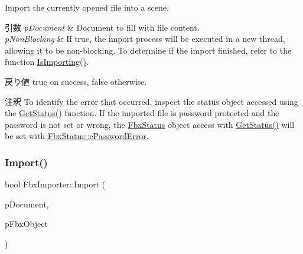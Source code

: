 Import the currently opened file into a scene. 
\begin{DoxyParams}{引数}
{\em p\+Document} & Document to fill with file content. \\
\hline
{\em p\+Non\+Blocking} & If true, the import process will be executed in a new thread, allowing it to be non-\/blocking. To determine if the import finished, refer to the function \hyperlink{class_fbx_importer_a8146a9982be07e4e287eb17b1c291c0b}{Is\+Importing()}. \\
\hline
\end{DoxyParams}
\begin{DoxyReturn}{戻り値}
{\ttfamily true} on success, {\ttfamily false} otherwise. 
\end{DoxyReturn}
\begin{DoxyRemark}{注釈}
To identify the error that occurred, inspect the status object accessed using the \hyperlink{class_fbx_i_o_base_a078e47a99b119278ca3ee639e2da5b6d}{Get\+Status()} function. If the imported file is password protected and the password is not set or wrong, the \hyperlink{class_fbx_status}{Fbx\+Status} object access with \hyperlink{class_fbx_i_o_base_a078e47a99b119278ca3ee639e2da5b6d}{Get\+Status()} will be set with \hyperlink{class_fbx_status_a6a631d5d95b28e31a19aabd5f5809eccaac3f30237566cb5a030bc0366afb5131}{Fbx\+Status\+::e\+Password\+Error}. 
\end{DoxyRemark}
\mbox{\label{class_fbx_importer_a04bd6be7ae002ef88084e50ef4b43164}} 
\subsubsection{\texorpdfstring{Import()}{Import()}\hspace{0.1cm}{\footnotesize\ttfamily [2/2]}}
{\footnotesize\ttfamily bool Fbx\+Importer\+::\+Import (\begin{DoxyParamCaption}\item[{\hyperlink{class_fbx_document}{Fbx\+Document} $\ast$}]{p\+Document,  }\item[{\hyperlink{class_fbx_i_o}{Fbx\+IO} $\ast$}]{p\+Fbx\+Object }\end{DoxyParamCaption})\hspace{0.3cm}{\ttfamily [protected]}}

\mbox{\label{class_fbx_importer_a70528a9ca1ff737bda9696a2073acd13}} 
